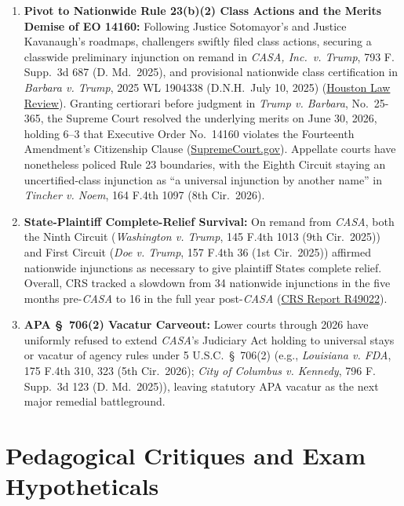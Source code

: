 \documentclass[12pt]{article}
\begin{document}
\begin{enumerate}
  \item \textbf{Pivot to Nationwide Rule 23(b)(2) Class Actions and the Merits Demise of EO 14160:} Following Justice Sotomayor's and Justice Kavanaugh's roadmaps, challengers swiftly filed class actions, securing a classwide preliminary injunction on remand in \textit{CASA, Inc.\ v. Trump}, 793 F. Supp.\ 3d 687 (D. Md.\ 2025), and provisional nationwide class certification in \textit{Barbara v. Trump}, 2025 WL 1904338 (D.N.H.\ July 10, 2025) (\href{https://houstonlawreview.org/article/171991-from-universal-injunctions-to-nationwide-classes-what-_barbara-v-trump_-reveals-about-_casa_-s-remedial-framework.pdf}{Houston Law Review}). Granting certiorari before judgment in \textit{Trump v. Barbara}, No.\ 25-365, the Supreme Court resolved the underlying merits on June 30, 2026, holding 6--3 that Executive Order No.\ 14160 violates the Fourteenth Amendment's Citizenship Clause (\href{https://www.supremecourt.gov/opinions/25pdf/25-365_4hdj.pdf}{SupremeCourt.gov}). Appellate courts have nonetheless policed Rule 23 boundaries, with the Eighth Circuit staying an uncertified-class injunction as ``a universal injunction by another name'' in \textit{Tincher v. Noem}, 164 F.4th 1097 (8th Cir.\ 2026).
  \item \textbf{State-Plaintiff Complete-Relief Survival:} On remand from \textit{CASA}, both the Ninth Circuit (\textit{Washington v. Trump}, 145 F.4th 1013 (9th Cir.\ 2025)) and First Circuit (\textit{Doe v. Trump}, 157 F.4th 36 (1st Cir.\ 2025)) affirmed nationwide injunctions as necessary to give plaintiff States complete relief. Overall, CRS tracked a slowdown from 34 nationwide injunctions in the five months pre-\textit{CASA} to 16 in the full year post-\textit{CASA} (\href{https://www.everycrsreport.com/reports/R49022.html}{CRS Report R49022}).
  \item \textbf{APA \S\ 706(2) Vacatur Carveout:} Lower courts through 2026 have uniformly refused to extend \textit{CASA}'s Judiciary Act holding to universal stays or vacatur of agency rules under 5 U.S.C.\ \S\ 706(2) (e.g., \textit{Louisiana v. FDA}, 175 F.4th 310, 323 (5th Cir.\ 2026); \textit{City of Columbus v. Kennedy}, 796 F. Supp.\ 3d 123 (D. Md.\ 2025)), leaving statutory APA vacatur as the next major remedial battleground.
\end{enumerate}

\section{Pedagogical Critiques and Exam Hypotheticals}
\end{document}
